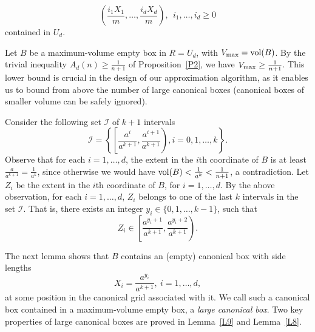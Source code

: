 \documentclass[11pt]{article}
\def\I{\mathcal I}
\newcommand{\vol}{{\rm vol}}
\begin{document}
\begin{equation} \label{E10}
\left(\frac{i_1 X_1}{m}, \ldots, \frac{i_d X_d}{m}\right), \ \ 
i_1,\ldots, i_d \geq 0 
\end{equation} 
contained in $U_d$. 

Let $B$ be a maximum-volume empty box in $R=U_d$, with
$V_{\rm max}=\vol(B)$. By the trivial inequality $A_d(n) \geq
\frac{1}{n+1}$ of Proposition~\ref{P2}, we have
$V_{\rm max} \geq \frac{1}{n+1}$. This lower bound is crucial
in the design of our approximation algorithm, as it enables us to
bound from above the number of large canonical boxes (canonical boxes
of smaller volume can be safely ignored).  

Consider the following set $\I$ of $k+1$ intervals 
\begin{equation} \label{E17}
\I=\left\{\left[\frac{a^i}{a^{k+1}}, \frac{a^{i+1}}{a^{k+1}}\right),
  i=0,1,\ldots,k\right\}. 
\end{equation} 
Observe that for each $i=1,\ldots,d$, the extent in the $i$th
coordinate of $B$ is at least $\frac{a}{a^{k+1}}=\frac{1}{a^k}$,
since otherwise we would have 
$\vol(B) < \frac{1}{a^k} < \frac{1}{n+1}$, a contradiction.
Let $Z_i$ be the extent in the $i$th coordinate of $B$, for
$i=1,\ldots,d$. By the above observation, for each $i=1,\ldots,d$,
$Z_i$ belongs to one of the last $k$ intervals in the set $\I$. That
is, there exists an integer $y_i \in \{0,1,\ldots,k-1\}$, such that 
\begin{equation} \label{E1}
Z_i \in 
\left[\frac{a^{y_i+1}}{a^{k+1}}, \frac{a^{y_i+2}}{a^{k+1}}\right). 
\end{equation} 

The next lemma shows that $B$ contains an (empty) canonical box
with side lengths 
\begin{equation} \label{E2}
X_i= \frac{a^{y_i}}{a^{k+1}}, \ i=1,\ldots,d, 
\end{equation} 
at some position in the canonical grid associated with it. 
We call such a canonical box contained in a maximum-volume empty box,
a  {\em large canonical box}. Two key properties of large
canonical boxes are proved in Lemma~\ref{L9} and Lemma~\ref{L8}. 
\end{document}
